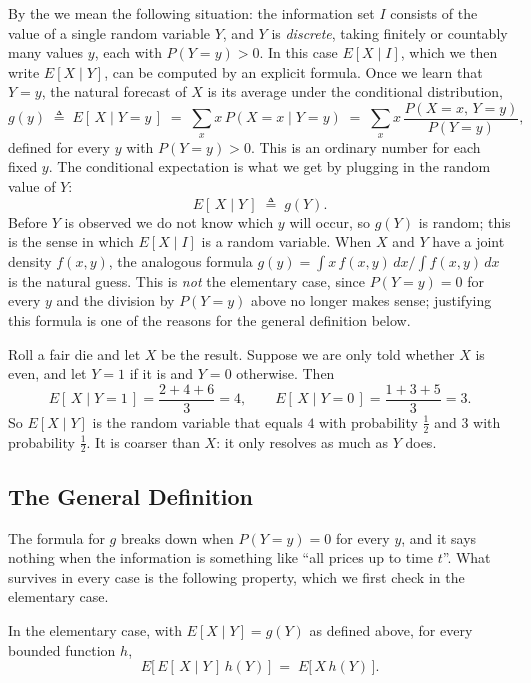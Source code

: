 By the  we mean the following situation:
the information set $I$ consists of the value of a single random variable $Y$, and $Y$ is \emph{discrete}, taking finitely or countably many values $y$, each with $P(Y=y)>0$.
In this case $E[X\mid I]$, which we then write $E[X\mid Y]$, can be computed by an explicit formula.
Once we learn that $Y=y$, the natural forecast of $X$ is its average under the conditional distribution,
\[
	g(y) \;\triangleq\; E[\,X\mid Y=y\,] \;=\; \sum_{x} x\,P(X=x\mid Y=y)
	\;=\; \sum_{x} x\,\frac{P(X=x,\,Y=y)}{P(Y=y)} ,
\]
defined for every $y$ with $P(Y=y)>0$.
This is an ordinary number for each fixed $y$.
The conditional expectation is what we get by plugging in the random value of $Y$:
\[
	E[\,X\mid Y\,] \;\triangleq\; g(Y) .
\]
Before $Y$ is observed we do not know which $y$ will occur, so $g(Y)$ is random; this is the sense in which $E[X\mid I]$ is a random variable.
When $X$ and $Y$ have a joint density $f(x,y)$, the analogous formula
$g(y)=\int x\,f(x,y)\,dx\big/\!\int f(x,y)\,dx$ is the natural guess.
This is \emph{not} the elementary case, since $P(Y=y)=0$ for every $y$ and the division by $P(Y=y)$ above no longer makes sense; justifying this formula is one of the reasons for the general definition below.

\begin{eg}
	Roll a fair die and let $X$ be the result.
	Suppose we are only told whether $X$ is even, and let $Y=1$ if it is and $Y=0$ otherwise.
	Then
	\[
		E[\,X\mid Y=1\,] = \frac{2+4+6}{3} = 4 ,
		\qquad
		E[\,X\mid Y=0\,] = \frac{1+3+5}{3} = 3 .
	\]
	So $E[X\mid Y]$ is the random variable that equals $4$ with probability $\tfrac12$ and $3$ with probability $\tfrac12$.
	It is coarser than $X$: it only resolves as much as $Y$ does.
\end{eg}

\subsection{The General Definition}

The formula for $g$ breaks down when $P(Y=y)=0$ for every $y$, and it says nothing when the information is something like ``all prices up to time $t$''.
What survives in every case is the following property, which we first check in the elementary case.

\begin{lemma}\label{lem:ce-defining}
	In the elementary case, with $E[X\mid Y]=g(Y)$ as defined above, for every bounded function $h$,
	\begin{equation}
		E\bigl[\,E[\,X\mid Y\,]\,h(Y)\,\bigr] \;=\; E\bigl[\,X\,h(Y)\,\bigr] . \label{eq:ce-defining}
	\end{equation}
\end{lemma}

